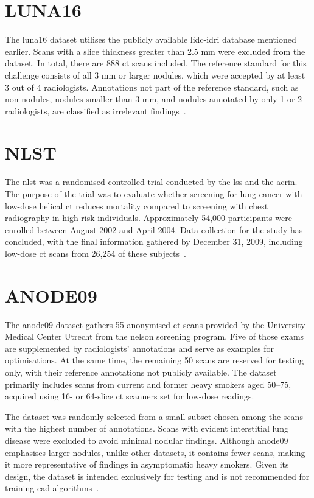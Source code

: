 \section{LUNA16}\label{luna16}
The \acf{luna16} dataset utilises the publicly available \ac{lidc-idri} database mentioned earlier. Scans with a slice thickness greater than 2.5 mm were excluded from the dataset. In total, there are 888 \ac{ct} scans included. The reference standard for this challenge consists of all 3 mm or larger nodules, which were accepted by at least 3 out of 4 radiologists. Annotations not part of the reference standard, such as non-nodules, nodules smaller than 3 mm, and nodules annotated by only 1 or 2 radiologists, are classified as irrelevant findings~\cite{setio_luna16_2016}.

\section{NLST}\label{nlst}
The \acf{nlst} was a randomised controlled trial conducted by the \ac{lss} and the \ac{acrin}. The purpose of the trial was to evaluate whether screening for lung cancer with low-dose helical \ac{ct} reduces mortality compared to screening with chest radiography in high-risk individuals. 
Approximately 54,000 participants were enrolled between August 2002 and April 2004. Data collection for the study has concluded, with the final information gathered by December 31, 2009, including low-dose \ac{ct} scans from 26,254 of these subjects~\cite{national_lung_screening_trial_research_team_data_2013, national_lung_screening_trial_research_team_reduced_2011}.

\section{ANODE09}\label{anode09}
The \acf{anode09} dataset gathers 55 anonymised \ac{ct} scans provided by the University Medical Center Utrecht from the \ac{nelson} screening program. Five of those exams are supplemented by radiologists' annotations and serve as examples for optimisations. At the same time, the remaining 50 scans are reserved for testing only, with their reference annotations not publicly available. The dataset primarily includes scans from current and former heavy smokers aged 50–75, acquired using 16- or 64-slice \ac{ct} scanners set for low-dose readings.

The dataset was randomly selected from a small subset chosen among the scans with the highest number of annotations. Scans with evident interstitial lung disease were excluded to avoid minimal nodular findings. Although \ac{anode09} emphasises larger nodules, unlike other datasets, it contains fewer scans, making it more representative of findings in asymptomatic heavy smokers. Given its design, the dataset is intended exclusively for testing and is not recommended for training \ac{cad} algorithms~\cite{ginneken_comparing_2010}.

